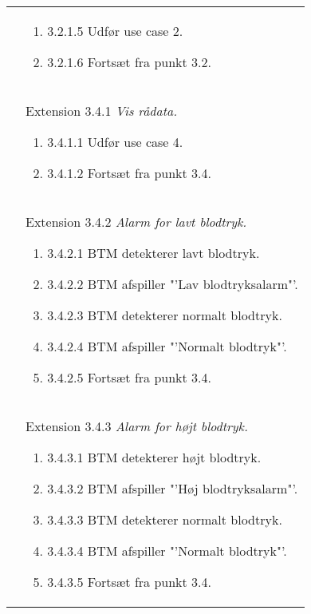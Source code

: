 \begin{table}[H]
\begin{tabular}{|p{5.5cm}|p{10cm}|}
\hline
& \begin{enumerate}
\item[\labelname]3.2.1.5   Udfør use case 2.
\item[\labelname]3.2.1.6   Fortsæt fra punkt 3.2. 
\end{enumerate}
\\
& Extension 3.4.1 \textit{Vis rådata.}
\begin{enumerate}
\setlength\itemsep{0.1em}
\item[\labelname]3.4.1.1   Udfør use case 4.
\item[\labelname]3.4.1.2   Fortsæt fra punkt 3.4. 
\end{enumerate}
\\
& Extension 3.4.2 \textit{Alarm for lavt blodtryk.}
\begin{enumerate}
\setlength\itemsep{0.1em}
\item[\labelname]3.4.2.1   BTM detekterer lavt blodtryk.
\item[\labelname]3.4.2.2   BTM afspiller "'Lav blodtryksalarm"'.
\item[\labelname]3.4.2.3   BTM detekterer normalt blodtryk.
\item[\labelname]3.4.2.4   BTM afspiller "'Normalt blodtryk"'. 
\item[\labelname]3.4.2.5   Fortsæt fra punkt 3.4. 
\end{enumerate}
\\
& Extension 3.4.3 \textit{Alarm for højt blodtryk.}
\begin{enumerate}
\setlength\itemsep{0.1em}
\item[\labelname]3.4.3.1   BTM detekterer højt blodtryk.
\item[\labelname]3.4.3.2   BTM afspiller "'Høj blodtryksalarm"'.
\item[\labelname]3.4.3.3   BTM detekterer normalt blodtryk.
\item[\labelname]3.4.3.4   BTM afspiller "'Normalt blodtryk"'. 
\item[\labelname]3.4.3.5   Fortsæt fra punkt 3.4. 
\end{enumerate}

\\\hline
\end{tabular}
\end{table}

